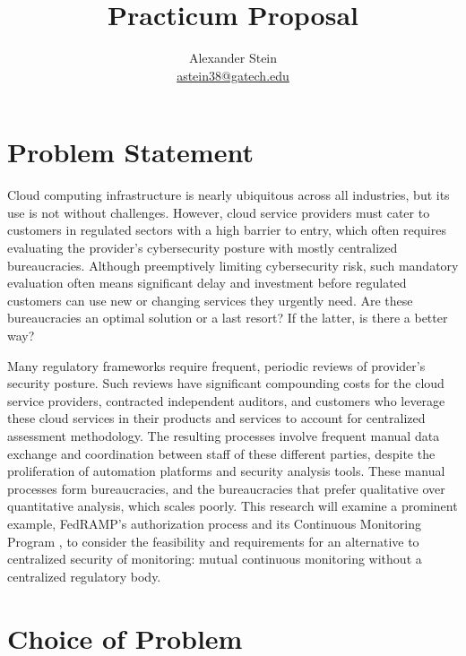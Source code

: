 \documentclass{jdf}
\begin{document}
\title{Practicum Proposal}
\author{Alexander Stein \\ \href{mailto:astein38@gatech.edu}{astein38@gatech.edu}}

\maketitle
\thispagestyle{fancy}

\section{Problem Statement}

Cloud computing infrastructure is nearly ubiquitous across all industries, but its use is not without challenges. However, cloud service providers must cater to customers in regulated sectors with a high barrier to entry, which often requires evaluating the provider's cybersecurity posture with mostly centralized bureaucracies. Although preemptively limiting cybersecurity risk, such mandatory evaluation often means significant delay and investment before regulated customers can use new or changing services they urgently need. Are these bureaucracies an optimal solution or a last resort? If the latter, is there a better way?

Many regulatory frameworks require frequent, periodic reviews of provider's security posture. Such reviews have significant compounding costs for the cloud service providers, contracted independent auditors, and customers who leverage these cloud services in their products and services to account for centralized assessment methodology. The resulting processes involve frequent manual data exchange and coordination between staff of these different parties, despite the proliferation of automation platforms and security analysis tools. These manual processes form bureaucracies, and the bureaucracies that prefer qualitative over quantitative analysis, which scales poorly. This research will examine a prominent example, FedRAMP's authorization process and its Continuous Monitoring Program \citeyear[p.~18]{fedramp_csp_playbook}, to consider the feasibility and requirements for an alternative to centralized security of monitoring: mutual continuous monitoring without a centralized regulatory body.

\section{Choice of Problem}
\end{document}
